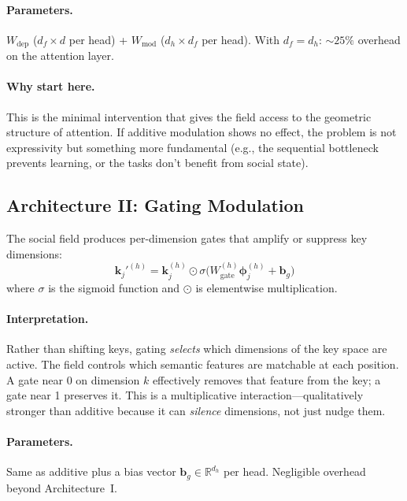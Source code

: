 \documentclass[11pt,a4paper]{article}
\newcommand{\field}{\bm{\phi}}
\newcommand{\R}{\mathbb{R}}
\newcommand{\K}{\bm{k}}
\begin{document}
\paragraph{Parameters.}  $W_{\text{dep}}$ ($d_f \times d$ per head)
+ $W_{\text{mod}}$ ($d_h \times d_f$ per head).  With $d_f = d_h$:
$\sim\!25\%$ overhead on the attention layer.

\paragraph{Why start here.}  This is the minimal intervention that
gives the field access to the geometric structure of attention.  If
additive modulation shows no effect, the problem is not expressivity
but something more fundamental (e.g., the sequential bottleneck
prevents learning, or the tasks don't benefit from social state).

\subsection{Architecture II: Gating Modulation}
\label{sec:arch_gating}

The social field produces per-dimension gates that amplify or suppress
key dimensions:
\begin{equation}
    \K_j'^{(h)} = \K_j^{(h)} \odot \sigma\!\bigl(
        W_{\text{gate}}^{(h)} \field_j^{(h)} + \bm{b}_g\bigr)
    \label{eq:gating_mod}
\end{equation}
where $\sigma$ is the sigmoid function and $\odot$ is elementwise
multiplication.

\paragraph{Interpretation.}  Rather than shifting keys, gating
\emph{selects} which dimensions of the key space are active.  The
field controls which semantic features are matchable at each
position.  A gate near 0 on dimension $k$ effectively removes that
feature from the key; a gate near 1 preserves it.  This is a
multiplicative interaction---qualitatively stronger than additive
because it can \emph{silence} dimensions, not just nudge them.

\paragraph{Parameters.}  Same as additive plus a bias vector
$\bm{b}_g \in \R^{d_h}$ per head.  Negligible overhead beyond
Architecture~I.
\end{document}

